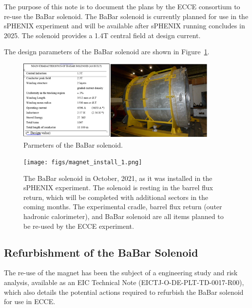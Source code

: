 The purpose of this note is to document the plans by the ECCE consortium to re-use the BaBar solenoid.  The BaBar solenoid is currently planned for use in the sPHENIX experiment and will be available after sPHENIX running concludes in 2025. The solenoid provides a 1.4T central field at design current. 

The design parameters of the BaBar solenoid are shown in Figure~\ref{fig:BaBarStats}. 

\begin{figure}[h!tbp]
    \centering
    \includegraphics[width=0.9\textwidth]{figs/BaBar_Stats.png}
    \caption{Parmeters of the BaBar solenoid.}
    \label{fig:BaBarStats}
\end{figure}

\begin{figure}[h!tbp]
    \centering
    \texttt{[image: figs/magnet\_install\_1.png]}
    \caption{The BaBar solenoid in October, 2021, as it was installed in the sPHENIX experiment. The solenoid is resting in the barrel flux return, which will be completed with additional sectors in the coming months.  The experimental cradle, barrel flux return (outer hadronic calorimeter), and BaBar solenoid are all items planned to be re-used by the ECCE experiment.}
    \label{fig:BaBarInSPHENIX}
\end{figure}

\subsection{Refurbishment of the BaBar Solenoid}

The re-use of the magnet has been the subject of a engineering study and risk analysis, available as an EIC Technical Note (EICTJ-O-DE-PLT-TD-0017-R00), which also details the potential actions required to refurbish the BaBar solenoid for use in ECCE. 

